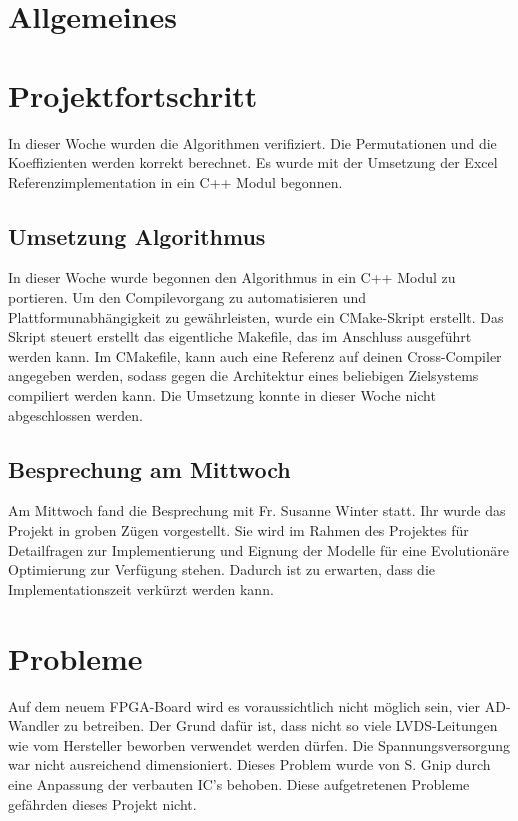 \documentclass[a4paper,12pt,fleqn]{article}
\begin{document}
\setlength{\headheight}{36pt}

\begin{titlepage}



\end{titlepage}

\section[Allgemeines]{Allgemeines}
%
\section[Fortschritt]{Projektfortschritt}
%
In dieser Woche wurden die Algorithmen verifiziert. Die Permutationen und die Koeffizienten werden korrekt berechnet. Es wurde mit der Umsetzung der Excel Referenzimplementation in ein C++ Modul begonnen.
%
\subsection{Umsetzung Algorithmus}
In dieser Woche wurde begonnen den Algorithmus in ein C++ Modul zu portieren. Um den Compilevorgang zu automatisieren und Plattformunabhängigkeit zu gewährleisten, wurde ein CMake-Skript erstellt. Das Skript steuert erstellt das eigentliche Makefile, das im Anschluss ausgeführt werden kann. Im CMakefile, kann auch eine Referenz auf deinen Cross-Compiler angegeben werden, sodass gegen die Architektur eines beliebigen Zielsystems compiliert werden kann. Die Umsetzung konnte in dieser Woche nicht abgeschlossen werden.
%
\subsection{Besprechung am Mittwoch}
Am Mittwoch fand die Besprechung mit Fr. Susanne Winter statt. Ihr wurde das Projekt in groben Zügen vorgestellt. Sie wird im Rahmen des Projektes für Detailfragen zur Implementierung und Eignung der Modelle für eine Evolutionäre Optimierung zur Verfügung stehen. Dadurch ist zu erwarten, dass die Implementationszeit verkürzt werden kann.
%
\section{Probleme}
\label{Problems}
Auf dem neuem FPGA-Board wird es voraussichtlich nicht möglich sein, vier AD-Wandler zu betreiben. Der Grund dafür ist, dass nicht so viele LVDS-Leitungen wie vom Hersteller beworben verwendet werden dürfen. Die Spannungsversorgung war nicht ausreichend dimensioniert. Dieses Problem wurde von S. Gnip durch eine Anpassung der verbauten IC's behoben. Diese aufgetretenen Probleme gefährden dieses Projekt nicht.
%


\newpage


\end{document}
